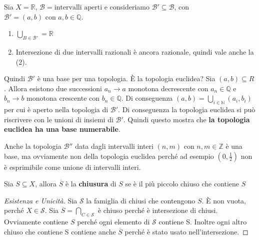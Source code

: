 \begin{example}
    Sia \(X = \mathbb{R}\), \(\mathcal{B} = \text{intervalli aperti}\) e
    consideriamo \(\mathcal{B}' \subseteq  \mathcal{B}\), con \(\mathcal{B}' =
    (a, b) \text{ con } a, b \in \mathbb{Q} \).
\begin{enumerate}[label = \arabic*)]
    \item \(\bigcup_{B \in  \mathcal{B}'} = \mathbb{R} \) 
    \item Intersezione di due intervalli razionali è ancora razionale, quindi
        vale anche la (2).
\end{enumerate}
    Quindi \(\mathcal{B}'\) è una base per una topologia. È la topologia
    euclidea? Sia \((a, b) \subseteq R\). Allora esistono due successioni \(a_n
    \to a\) monotona decrescente con \(a_n \in \mathbb{Q}\) e \(b_n \to  b\) monotona
    crescente con \(b_n \in \mathbb{Q}\). Di conseguenza \((a, b) = \bigcup_{i
    \in  \mathbb{N}} (a_i, b_{i})\) per cui è aperto nella topologia di
    \(\mathcal{B}'\). Di conseguenza la topologia euclidea si può riscrivere
    con le unioni di insiemi di \(\mathcal{B}'\). Quindi questo mostra che
    \textbf{la topologia euclidea ha una base numerabile}.
\end{example}
\begin{example}
    Anche la topologia \(\mathcal{B}''\) data dagli intervalli interi \((n, m)
    \text{ con } n, m \in \mathbb{Z}\) è una base, ma ovviamente non della
    topologia euclidea perché ad esempio \(\left(0, \frac{1}{2}\right)\) non è esprimibile
    come unione di intervalli interi.
\end{example}

\begin{definition}
    Sia \(S \subseteq  X\), allora \(\overline{S}\) è la \textbf{chiusura} di
    \(S\) se è il più piccolo chiuso che contiene \(S\) 
\end{definition}
\begin{proof}[Esistenza e Unicità]
    Sia \(\mathcal{S}\) la famiglia di chiusi che contengono \(S\). È non vuota,
    perché \(X \in \mathcal{S}\). Sia \(\overline{S} = \bigcap_{C \in
    \mathcal{S}} \) è chiuso perché è intersezione di chiusi. Ovviamente
    contiene \(S\) perché ogni elemento di \(\mathcal{S}\) contiene S. Inoltre
    ogni altro chiuso che contiene S contiene anche \(\overline{S}\) perché è
    stato usato nell'intersezione.
\end{proof}

